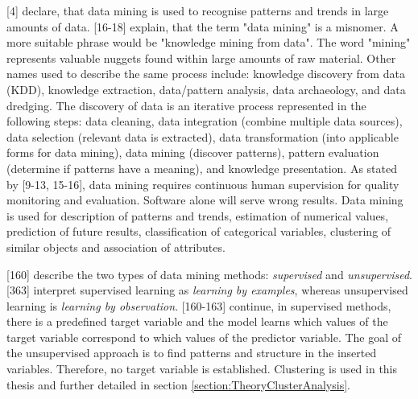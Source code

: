 
\textcite{DataMiningAndPredictiveAnalytics}[4] declare, that data mining is used to recognise patterns and trends in large amounts of data. \textcite{han2011data}[16-18] explain, that the term "data mining" is a misnomer. A more suitable phrase would be "knowledge mining from data". The word "mining" represents valuable nuggets found within large amounts of raw material. Other names used to describe the same process include: knowledge discovery from data (KDD), knowledge extraction, data/pattern analysis, data archaeology, and data dredging. The discovery of data is an iterative process represented in the following steps: data cleaning, data integration (combine multiple data sources), data selection (relevant data is extracted), data transformation (into applicable forms for data mining), data mining (discover patterns), pattern evaluation (determine if patterns have a meaning), and knowledge presentation. 
As stated by \textcite{DataMiningAndPredictiveAnalytics}[9-13, 15-16], data mining requires continuous human supervision for quality monitoring and evaluation. Software alone will serve wrong results. Data mining is used for description of patterns and trends, estimation of numerical values, prediction of future results, classification of categorical variables, clustering of similar objects and association of attributes. 

\textcite{DataMiningAndPredictiveAnalytics}[160] describe the two types of data mining methods: \textit{supervised} and \textit{unsupervised}. \textcite{han2011data}[363] interpret supervised learning as \textit{learning by examples}, whereas unsupervised learning is \textit{learning by observation}. \textcite{DataMiningAndPredictiveAnalytics}[160-163] continue, in supervised methods, there is a predefined target variable and the model learns which values of the target variable correspond to which values of the predictor variable. The goal of the unsupervised approach is to find patterns and structure in the inserted variables. Therefore, no target variable is established. Clustering is used in this thesis and further detailed in section \ref{section:TheoryClusterAnalysis}.